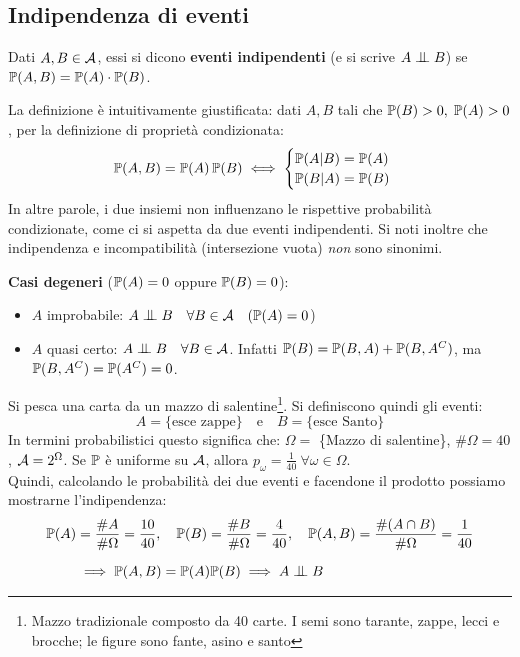 \subsection{Indipendenza di eventi}
\begin{defn}
  Dati $A, B \in \mathcal A$, essi si dicono \textbf{eventi indipendenti} (e si scrive $A \indep B$) se $\mathbb P(A,B) = \mathbb P(A) \cdot \mathbb P(B)$.
\end{defn}
La definizione è intuitivamente giustificata: dati $A,B$ tali che $\mathbb P(B) > 0, \; \mathbb P(A) > 0$, per la definizione di proprietà condizionata:
$$\mathbb P(A,B) = \mathbb P(A) \, \mathbb P(B) \iff \begin{cases}\mathbb P(A|B) = \mathbb P(A) \\ \mathbb P(B|A) = \mathbb P(B) \end{cases}$$
In altre parole, i due insiemi non influenzano le rispettive probabilità condizionate, come ci si aspetta da due eventi indipendenti.
Si noti inoltre che indipendenza e incompatibilità (intersezione vuota) \textit{non} sono sinonimi.

\textbf{Casi degeneri} ($\mathbb P(A) = 0$ oppure  $\mathbb P(B) = 0$):
\begin{itemize}
  \item $A$ improbabile: $A \indep B \quad \forall B \in \Ac \quad (\PP(A) = 0$)
  \item $A$ quasi certo: $A \indep B \quad \forall B \in \Ac$.
    Infatti $\mathbb P(B) = \mathbb P(B,A) + \mathbb P(B,A^C)$, ma $\mathbb P(B,A^C) = \mathbb P(A^C) = 0$.
\end{itemize}

\bigskip
\begin{ese}
  Si pesca una carta da un mazzo di salentine\footnote{Mazzo tradizionale composto da 40 carte.
  I semi sono tarante, zappe, lecci e brocche; le figure sono fante, asino e santo}. Si definiscono quindi gli eventi:
  $$A = \{\text{esce zappe}\} \quad \text{e} \quad
  B = \{\text{esce Santo}\}$$
  In termini probabilistici questo significa che:
  $\Omega =$ \{Mazzo di salentine\},
  $\#\Omega = 40$,
  $\mathcal A = 2^\Omega$.
  Se $\mathbb P$ è uniforme su $\mathcal A$, allora $p_\omega = \frac{1}{40} \ \forall \omega \in \Omega$.\\
  Quindi, calcolando le probabilità dei due eventi e facendone il prodotto possiamo mostrarne l'indipendenza:
  \begin{align*}
    \PP(A) &= \frac{\#A}{\#\Omega} = \frac{10}{40}, \quad \PP(B) = \frac{\#B}{\#\Omega} = \frac{4}{40}, \quad \PP(A,B) = \frac{\#(A \cap B)}{\#\Omega} = \frac{1}{40}\\[6pt]
    &\implies  \PP(A,B) = \PP(A)\PP(B) \implies A \indep B
  \end{align*}
\end{ese}

